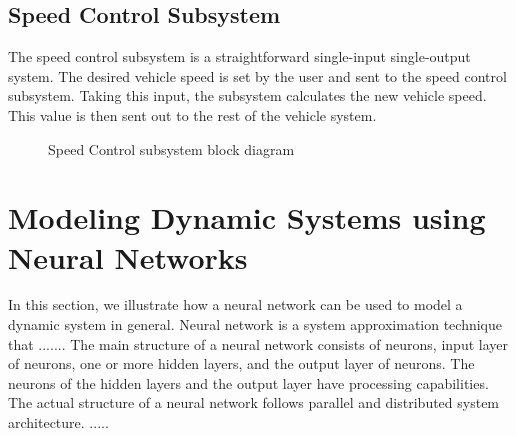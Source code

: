 \documentclass[journal,twoside,web]{ieeecolor}
\begin{document}
  \subsection{Speed Control Subsystem}
  The speed control subsystem is a straightforward single-input single-output system. The desired vehicle speed is set by the user and sent to the speed control subsystem. Taking this input, the subsystem calculates the new vehicle speed. This value is then sent out to the rest of the vehicle system. 
 \begin{figure}[htbp]
    \centering
    \caption{Speed Control subsystem block diagram}
    \label{fig:speedControlModelArchitecture}
 \end{figure}



 \section{Modeling Dynamic Systems using Neural Networks}

 In this section, we illustrate how a neural network can be used to model a
 dynamic system in general. Neural network is a system approximation technique
 that .......
 The main structure of a neural network consists of neurons, input layer of
 neurons, one or more hidden layers, and the output layer of neurons. The
 neurons of the hidden layers and the output layer have processing capabilities.
 The actual structure of a neural network follows parallel and distributed system
 architecture. .....
\end{document}
